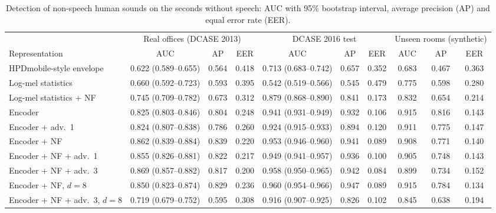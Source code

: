 \documentclass[11pt]{article}
\begin{document}
\begin{table}[h]
\centering\footnotesize
\caption{Detection of non-speech human sounds on the seconds without speech: AUC with 95\% bootstrap interval, average precision (AP) and equal error rate (EER).}
\label{tab:nonspeech}
\setlength{\tabcolsep}{2.6pt}
\begin{tabular}{@{}lccccccccc@{}}
\toprule
& \multicolumn{3}{c}{Real offices (DCASE 2013)} & \multicolumn{3}{c}{DCASE 2016 test} & \multicolumn{3}{c}{Unseen rooms (synthetic)} \\
\cmidrule(lr){2-4}\cmidrule(lr){5-7}\cmidrule(lr){8-10}
Representation & AUC & AP & EER & AUC & AP & EER & AUC & AP & EER \\
\midrule
HPDmobile-style envelope & 0.622 (0.589--0.655) & 0.564 & 0.418 & 0.713 (0.683--0.742) & 0.657 & 0.352 & 0.683 & 0.467 & 0.363 \\
Log-mel statistics & 0.660 (0.592--0.723) & 0.593 & 0.395 & 0.542 (0.519--0.566) & 0.545 & 0.479 & 0.775 & 0.598 & 0.280 \\
Log-mel statistics + NF & 0.745 (0.709--0.782) & 0.673 & 0.312 & 0.879 (0.868--0.890) & 0.841 & 0.173 & 0.832 & 0.654 & 0.214 \\
Encoder & 0.825 (0.803--0.846) & 0.804 & 0.248 & 0.941 (0.931--0.949) & 0.932 & 0.106 & 0.915 & 0.816 & 0.143 \\
Encoder + adv.\ 1 & 0.824 (0.807--0.838) & 0.786 & 0.260 & 0.924 (0.915--0.933) & 0.894 & 0.120 & 0.911 & 0.775 & 0.147 \\
Encoder + NF & 0.862 (0.839--0.884) & 0.839 & 0.220 & 0.953 (0.946--0.960) & 0.941 & 0.089 & 0.908 & 0.771 & 0.140 \\
Encoder + NF + adv.\ 1 & 0.855 (0.826--0.881) & 0.822 & 0.217 & 0.949 (0.941--0.957) & 0.936 & 0.100 & 0.905 & 0.748 & 0.143 \\
Encoder + NF + adv.\ 3 & 0.869 (0.857--0.882) & 0.817 & 0.200 & 0.958 (0.950--0.965) & 0.942 & 0.084 & 0.899 & 0.734 & 0.152 \\
Encoder + NF, $d=8$ & 0.850 (0.823--0.874) & 0.829 & 0.236 & 0.960 (0.954--0.966) & 0.947 & 0.089 & 0.915 & 0.784 & 0.134 \\
Encoder + NF + adv.\ 3, $d=8$ & 0.719 (0.679--0.752) & 0.595 & 0.308 & 0.916 (0.907--0.925) & 0.826 & 0.102 & 0.845 & 0.638 & 0.194 \\
\bottomrule
\end{tabular}
\end{table}
\end{document}
